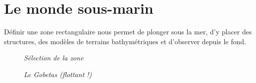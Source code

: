 \chapter{Le monde sous-marin}
Définir une zone rectangulaire  nous permet de plonger sous la mer, d'y placer des structures, des modèles de terrains bathymétriques et d'observer depuis le fond.
\begin{center}
\begin{figure}[ht]
\caption{\label{equiProj}\textit{Sélection de la zone}}
\end{figure}
\end{center}
\begin{center}
\begin{figure}[ht]
\caption{\label{equiProj}\textit{Le Gobetas (flottant !)}}
\end{figure}
\end{center}
